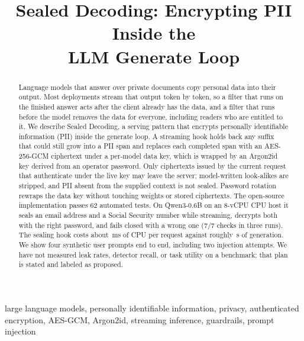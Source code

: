 \documentclass[conference]{IEEEtran}
\begin{document}
\title{Sealed Decoding: Encrypting PII Inside the\\LLM Generate Loop}

\author{
}

\maketitle

\begin{abstract}
Language models that answer over private documents copy personal data into their output. Most deployments stream that output token by token, so a filter that runs on the finished answer acts after the client already has the data, and a filter that runs before the model removes the data for everyone, including readers who are entitled to it. We describe Sealed Decoding, a serving pattern that encrypts personally identifiable information (PII) inside the generate loop. A streaming hook holds back any suffix that could still grow into a PII span and replaces each completed span with an AES-256-GCM ciphertext under a per-model data key, which is wrapped by an Argon2id key derived from an operator password. Only ciphertexts issued by the current request that authenticate under the live key may leave the server; model-written look-alikes are stripped, and PII absent from the supplied context is not sealed. Password rotation rewraps the data key without touching weights or stored ciphertexts. The open-source implementation passes 62 automated tests. On Qwen3-0.6B on an 8-vCPU CPU host it seals an email address and a Social Security number while streaming, decrypts both with the right password, and fails closed with a wrong one (7/7 checks in three runs). The sealing hook costs about \mhookMs\,ms of CPU per request against roughly \msealedS\,s of generation. We show four synthetic user prompts end to end, including two injection attempts. We have not measured leak rates, detector recall, or task utility on a benchmark; that plan is stated and labeled as proposed.
\end{abstract}

\begin{IEEEkeywords}
large language models, personally identifiable information, privacy, authenticated encryption, AES-GCM, Argon2id, streaming inference, guardrails, prompt injection
\end{IEEEkeywords}
\end{document}

